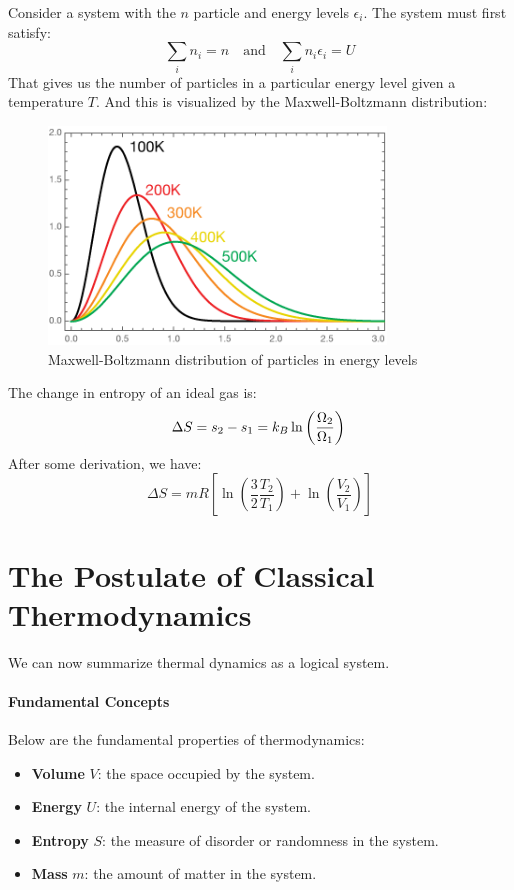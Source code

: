\documentclass[11pt]{report}
\begin{document}
\begin{definition}
    Consider a system with the $n$ particle and energy levels $\epsilon_i$. The system must first satisfy:
    $$
        \sum_i n_i = n \quad \text{and} \quad \sum_i n_i \epsilon_i = U
    $$ 
    That gives us the number of particles in a particular energy level given a temperature $T$. And this is visualized by the Maxwell-Boltzmann distribution:
    \begin{figure}[h!]
        \centering
        \includegraphics[width=0.8\textwidth]{MBGraph2.png}
        \caption{Maxwell-Boltzmann distribution of particles in energy levels}
    \end{figure}
\end{definition}
\begin{definition}
    The change in entropy of an ideal gas is:
    \begin{equation}
        \Delta S = s_2 - s_1 = k_B \ln\left(\frac{\Omega_2}{\Omega_1}\right) \\
    \end{equation}
    After some derivation, we have:
    \begin{equation}
        \Delta S = mR \left[ \ln\left(\frac{3}{2} \frac{T_2}{T_1}\right) + \ln\left(\frac{V_2}{V_1}\right) \right]
    \end{equation}
\end{definition}

\section{The Postulate of Classical Thermodynamics}
We can now summarize thermal dynamics as a logical system.

\paragraph{Fundamental Concepts} Below are the fundamental properties of thermodynamics:
\begin{itemize}
    \item \textbf{Volume} $V$: the space occupied by the system.
    \item \textbf{Energy} $U$: the internal energy of the system.
    \item \textbf{Entropy} $S$: the measure of disorder or randomness in the system.
    \item \textbf{Mass} $m$: the amount of matter in the system.
\end{itemize}
\end{document}
